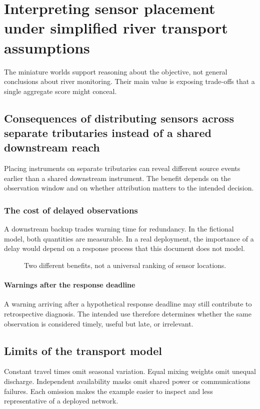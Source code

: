 \chapter{Interpreting sensor placement under simplified river transport assumptions}\label{demo-interpretation}
The miniature worlds support reasoning about the objective, not general conclusions about river monitoring. Their main value is exposing trade-offs that a single aggregate score might conceal.
\section{Consequences of distributing sensors across separate tributaries instead of a shared downstream reach}\label{demo-interpretation-diversity}
Placing instruments on separate tributaries can reveal different source events earlier than a shared downstream instrument. The benefit depends on the observation window and on whether attribution matters to the intended decision.
\subsection{The cost of delayed observations}\label{demo-interpretation-delay}
A downstream backup trades warning time for redundancy. In the fictional model, both quantities are measurable. In a real deployment, the importance of a delay would depend on a response process that this document does not model.
\begin{figure}[htbp]
\centering
{}
\caption{Two different benefits, not a universal ranking of sensor locations.}\label{demo-fig-tradeoff}
\end{figure}
\subsubsection{Warnings after the response deadline}\label{demo-interpretation-window}
A warning arriving after a hypothetical response deadline may still contribute to retrospective diagnosis. The intended use therefore determines whether the same observation is considered timely, useful but late, or irrelevant.
\section{Limits of the transport model}\label{demo-interpretation-limits}
Constant travel times omit seasonal variation. Equal mixing weights omit unequal discharge. Independent availability masks omit shared power or communications failures. Each omission makes the example easier to inspect and less representative of a deployed network.
